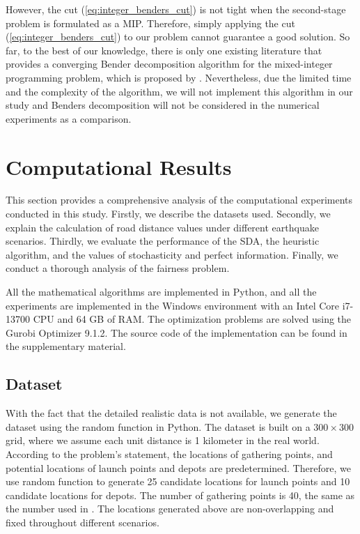 \documentclass[preprint,review,11pt,authoryear]{elsarticle}
\begin{document}
However, the cut (\ref{eq:integer_benders_cut}) is not tight when the second-stage problem is formulated as a MIP. Therefore, simply applying the cut (\ref{eq:integer_benders_cut}) to our problem cannot guarantee a good solution. So far, to the best of our knowledge, there is only one existing literature that provides a converging Bender decomposition algorithm for the mixed-integer programming problem, which is proposed by \cite{van2023converging}. Nevertheless, due the limited time and the complexity of the algorithm, we will not implement this algorithm in our study and Benders decomposition will not be considered in the numerical experiments as a comparison.

\section{Computational Results}\label{sec:results}
This section provides a comprehensive analysis of the computational experiments conducted in this study. Firstly, we describe the datasets used. Secondly, we explain the calculation of road distance values under different earthquake scenarios. Thirdly, we evaluate the performance of the SDA, the heuristic algorithm, and the values of stochasticity and perfect information. Finally, we conduct a thorough analysis of the fairness problem.

All the mathematical algorithms are implemented in Python, and all the experiments are implemented in the Windows environment with an Intel Core i7-13700 CPU and 64 GB of RAM. The optimization problems are solved using the Gurobi Optimizer 9.1.2. The source code of the implementation can be found in the supplementary material.

\subsection{Dataset} \label{subsec:Dataset}
With the fact that the detailed realistic data is not available, we generate the dataset using the random function in Python. The dataset is built on a $300 \times 300$ grid, where we assume each unit distance is 1 kilometer in the real world. According to the problem's statement, the locations of gathering points, and potential locations of launch points and depots are predetermined. Therefore, we use random function to generate 25 candidate locations for launch points and 10 candidate locations for depots. The number of gathering points is 40, the same as the number used in \cite{dukkanci2023drones}. The locations generated above are non-overlapping and fixed throughout different scenarios. 
\end{document}
